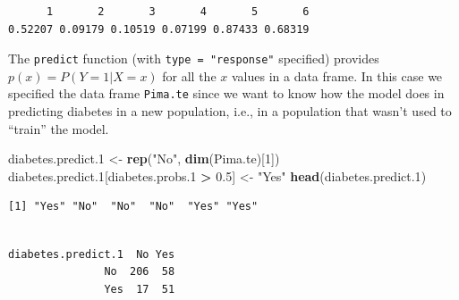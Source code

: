 \documentclass[
]{krantz}
\makeatletter
\newenvironment{Shaded}{\begin{snugshade}}{\end{snugshade}}
\newcommand{\DecValTok}[1]{\textcolor[rgb]{0.06,0.06,0.06}{#1}}
\newcommand{\FloatTok}[1]{\textcolor[rgb]{0.06,0.06,0.06}{#1}}
\newcommand{\KeywordTok}[1]{\textcolor[rgb]{0.27,0.27,0.27}{\textbf{#1}}}
\newcommand{\NormalTok}[1]{#1}
\newcommand{\OperatorTok}[1]{\textcolor[rgb]{0.43,0.43,0.43}{\textbf{#1}}}
\newcommand{\StringTok}[1]{\textcolor[rgb]{0.5,0.5,0.5}{#1}}
\newenvironment{kframe}{%
\medskip{}
\setlength{\fboxsep}{.8em}
 \def\at@end@of@kframe{}%
 \ifinner\ifhmode%
  \def\at@end@of@kframe{\end{minipage}}%
  \begin{minipage}{\columnwidth}%
 \fi\fi%
 \def\FrameCommand##1{\hskip\@totalleftmargin \hskip-\fboxsep
 \colorbox{shadecolor}{##1}\hskip-\fboxsep
     \hskip-\linewidth \hskip-\@totalleftmargin \hskip\columnwidth}%
 \MakeFramed {\advance\hsize-\width
   \@totalleftmargin\z@ \linewidth\hsize
   \@setminipage}}%
 {\par\unskip\endMakeFramed%
 \at@end@of@kframe}
\renewenvironment{Shaded}{\begin{kframe}}{\end{kframe}}
\makeatother
\begin{document}
\begin{verbatim}
      1       2       3       4       5       6 
0.52207 0.09179 0.10519 0.07199 0.87433 0.68319 
\end{verbatim}

The \texttt{predict} function (with \texttt{type\ =\ "response"} specified) provides \(p(x) = P(Y = 1 | X = x)\) for all the \(x\) values in a data frame. In this case we specified the data frame \texttt{Pima.te} since we want to know how the model does in predicting diabetes in a new population, i.e., in a population that wasn't used to ``train'' the model.

\begin{Shaded}
\begin{Highlighting}[]
\NormalTok{diabetes.predict}\FloatTok{.1}\NormalTok{ \textless{}{-}}\StringTok{ }\KeywordTok{rep}\NormalTok{(}\StringTok{"No"}\NormalTok{, }\KeywordTok{dim}\NormalTok{(Pima.te)[}\DecValTok{1}\NormalTok{])}
\NormalTok{diabetes.predict}\FloatTok{.1}\NormalTok{[diabetes.probs}\FloatTok{.1} \OperatorTok{\textgreater{}}\StringTok{ }\FloatTok{0.5}\NormalTok{] \textless{}{-}}\StringTok{ "Yes"}
\KeywordTok{head}\NormalTok{(diabetes.predict}\FloatTok{.1}\NormalTok{)}
\end{Highlighting}
\end{Shaded}

\begin{verbatim}
[1] "Yes" "No"  "No"  "No"  "Yes" "Yes"
\end{verbatim}

\begin{Shaded}
\end{Shaded}

\begin{verbatim}
                  
diabetes.predict.1  No Yes
               No  206  58
               Yes  17  51
\end{verbatim}

\begin{Shaded}
\end{Shaded}
\end{document}
